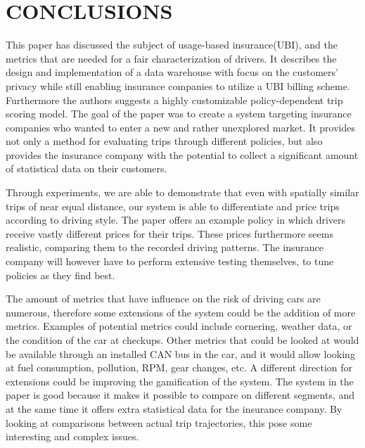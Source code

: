 \section{CONCLUSIONS}\label{sec:conclusion}
This paper has discussed the subject of usage-based insurance(UBI), and the metrics that are needed for a fair characterization of drivers. It describes the design and implementation of a data warehouse with focus on the customers' privacy while still enabling insurance companies to utilize a UBI billing scheme. Furthermore the authors suggests a highly customizable policy-dependent trip scoring model.
The goal of the paper was to create a system targeting insurance companies who wanted to enter a new and rather unexplored market. It provides not only a method for evaluating trips through different policies, but also provides the insurance company with the potential to collect a significant amount of statistical data on their customers.

Through experiments, we are able to demonstrate that even with spatially similar trips of near equal distance, our system is able to differentiate and price trips according to driving style. The paper offers an example policy in which drivers receive vastly different prices for their trips. These prices furthermore seems realistic, comparing them to the recorded driving patterns. The insurance company will however have to perform extensive testing themselves, to tune policies as they find best. 

The amount of metrics that have influence on the risk of driving cars are numerous, therefore some extensions of the system could be the addition of more metrics. Examples of potential metrics could include cornering, weather data, or the condition of the car at checkups. Other metrics that could be looked at would be available through an installed CAN bus in the car, and it would allow looking at fuel consumption, pollution, RPM, gear changes, etc.
A different direction for extensions could be improving the gamification of the system. The system in the paper is good because it makes it possible to compare on different segments, and at the same time it offers extra statistical data for the insurance company. By looking at comparisons between actual trip trajectories, this pose some interesting and complex issues.


\addtolength{\textheight}{-12cm}   %
